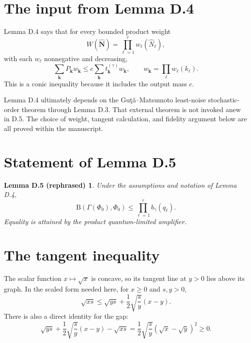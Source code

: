 \documentclass[11pt]{article}
\newcommand{\B}{\mathrm B}
\newtheorem*{lemmaD}{Lemma D.5 (rephrased)}
\begin{document}
\section{The input from Lemma D.4}

Lemma D.4 says that for every bounded product weight
\[
  W(\widehat{\mathbf N})
  =\prod_{\ell=1}^r w_\ell(\widehat N_\ell),
\]
with each $w_\ell$ nonnegative and decreasing,
\begin{equation}\label{eq:D4}
  \sum_{\mathbf k}P_{\mathbf k}w_{\mathbf k}
  \leq
  c\sum_{\mathbf k}t_{\mathbf k}^{(\gamma)}w_{\mathbf k},
  \qquad
  w_{\mathbf k}=\prod_\ell w_\ell(k_\ell).
\end{equation}
This is a conic inequality because it includes the output mass $c$.

Lemma D.4 ultimately depends on the Gu\c{t}\u{a}--Matsumoto least-noise
stochastic-order theorem through Lemma D.3.  That external theorem is not
invoked anew in D.5.  The choice of weight, tangent calculation, and fidelity
argument below are all proved within the manuscript.

\section{Statement of Lemma D.5}

\begin{lemmaD}
Under the assumptions and notation of Lemma D.4,
\begin{equation}\label{eq:D5}
  \B(\Gamma(\Phi_0),\Phi_0)
  \leq\prod_{\ell=1}^r b_\gamma(q_\ell).
\end{equation}
Equality is attained by the product quantum-limited amplifier.
\end{lemmaD}

\section{The tangent inequality}

The scalar function $x\mapsto\sqrt{x}$ is concave, so its tangent line at
$y>0$ lies above its graph.  In the scaled form needed here, for
$x\geq0$ and $s,y>0$,
\begin{equation}\label{eq:tangent-scalar}
  \sqrt{xs}
  \leq
  \sqrt{ys}+\frac12\sqrt{\frac{s}{y}}(x-y).
\end{equation}
There is also a direct identity for the gap:
\begin{equation}\label{eq:tangent-gap}
  \sqrt{ys}+\frac12\sqrt{\frac{s}{y}}(x-y)-\sqrt{xs}
  =\frac12\sqrt{\frac{s}{y}}(\sqrt{x}-\sqrt{y})^2\geq0.
\end{equation}
\end{document}
